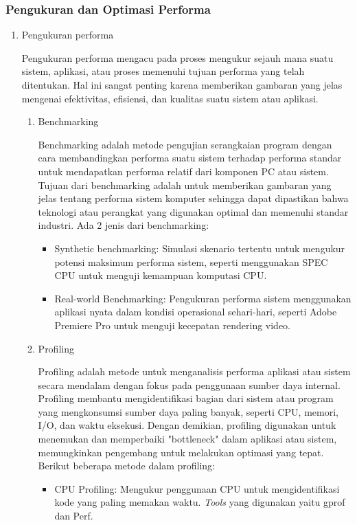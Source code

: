 \documentclass[12pt]{article}
\begin{document}
\subsubsection{Pengukuran dan Optimasi Performa}
\begin{enumerate}
    \item {Pengukuran performa}
    \par Pengukuran performa mengacu pada proses mengukur sejauh mana suatu sistem, aplikasi, atau proses memenuhi tujuan performa yang telah ditentukan. Hal ini sangat penting karena memberikan gambaran yang jelas mengenai efektivitas, efisiensi, dan kualitas suatu sistem atau aplikasi.
    \begin{enumerate}
        \item Benchmarking
        \par Benchmarking adalah metode pengujian serangkaian program dengan cara membandingkan performa suatu sistem terhadap performa standar untuk mendapatkan performa relatif dari komponen PC atau sistem. Tujuan dari benchmarking adalah untuk memberikan gambaran yang jelas tentang performa sistem komputer sehingga dapat dipastikan bahwa teknologi atau perangkat yang digunakan optimal dan memenuhi standar industri. Ada 2 jenis dari benchmarking:
        \begin{itemize}
        \item Synthetic benchmarking: Simulasi skenario tertentu untuk mengukur potensi maksimum performa sistem, seperti menggunakan SPEC CPU untuk menguji kemampuan komputasi CPU.
        \item Real-world Benchmarking: Pengukuran performa sistem menggunakan aplikasi nyata dalam kondisi operasional sehari-hari, seperti Adobe Premiere Pro untuk menguji kecepatan rendering video.
    \end{itemize}  
    \item Profiling
    \par Profiling adalah metode untuk menganalisis performa aplikasi atau sistem secara mendalam dengan fokus pada penggunaan sumber daya internal. Profiling membantu mengidentifikasi bagian dari sistem atau program yang mengkonsumsi sumber daya paling banyak, seperti CPU, memori, I/O, dan waktu eksekusi. Dengan demikian, profiling digunakan untuk menemukan dan memperbaiki "bottleneck" dalam aplikasi atau sistem, memungkinkan pengembang untuk melakukan optimasi yang tepat. Berikut beberapa metode dalam profiling:
    \begin{itemize}
        \item CPU Profiling: Mengukur penggunaan CPU untuk mengidentifikasi kode yang paling memakan waktu. \textit{Tools} yang digunakan yaitu gprof dan Perf.

\end{itemize}
\end{enumerate}
\end{enumerate}
\end{document}
